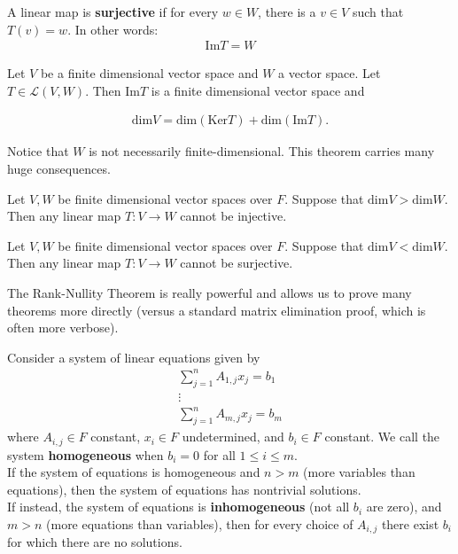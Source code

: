 \documentclass{memoir}
\begin{document}
\begin{prop}[Surjectivity]
	A linear map is \textbf{surjective} if for every $w \in W$, there is a $v \in V$ such that $T(v) = w$. In other words:
	\begin{align*}
	\textrm{Im}T = W
	\end{align*}
\end{prop}
\begin{thm}
	Let $V$ be a finite dimensional vector space and \(W\) a vector space. Let $T \in \mathcal{L}(V,W)$. Then $\textrm{Im}T$ is a finite dimensional vector space and 

	\begin{align*}
		\textrm{dim}V = \textrm{dim}(\textrm{Ker}T) + \text{dim}(\textrm{Im}T).
	\end{align*}
\end{thm}
Notice that \(W\) is not necessarily finite-dimensional. This theorem carries many huge consequences.
\begin{cor}
	Let $V,W$ be finite dimensional vector spaces over $F$. Suppose that $\text{dim}V > \text{dim}W$. Then any linear map $T:V\to W$ cannot be injective.
\end{cor}
\begin{cor}
	Let $V,W$ be finite dimensional vector spaces over $F$. Suppose that $\text{dim}V<\text{dim}W$. Then any linear map $T:V\to W$ cannot be surjective.
\end{cor}

The Rank-Nullity Theorem is really powerful and allows us to prove many theorems more directly (versus a standard matrix elimination proof, which is often more verbose).

\begin{prop}
	Consider a system of linear equations given by
	\begin{align*}
		\sum_{j=1}^{n} A_{1,j}x_j = b_1\\
		\vdots\\
		\sum_{j=1}^{n} A_{m,j}x_j = b_m
	\end{align*}
	where \(A_{i,j} \in F\) constant, \(x_i \in F\) undetermined, and \(b_i \in F\) constant. We call the system \textbf{homogeneous} when \(b_i = 0\) for all \(1\leq i\leq m\).\\

	If the system of equations is homogeneous and \(n>m\) (more variables than equations), then the system of equations has nontrivial solutions.\\

	If instead, the system of equations is \textbf{inhomogeneous} (not all \(b_i\) are zero), and \(m>n\) (more equations than variables), then for every choice of \(A_{i,j}\) there exist \(b_i\) for which there are no solutions. 
\end{prop}
\end{document}
